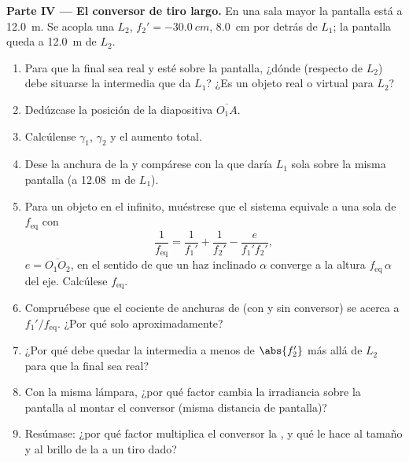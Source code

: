 \begin{problem}
\medskip
\noindent\textbf{Parte IV --- El conversor de tiro largo.}
En una sala mayor la pantalla está a \qty{12.0}{m}. Se acopla una  $L_2$, $f_2' = \qty{-30.0}{cm}$, \qty{8.0}{cm} por detrás de
$L_1$; la pantalla queda a \qty{12.0}{m} de $L_2$.
\begin{enumerate}[resume]
  \item Para que la  final sea real y esté sobre la pantalla, ¿dónde
        (respecto de $L_2$) debe situarse la  intermedia que da
        $L_1$? ¿Es un objeto real o virtual para $L_2$?
  \item Dedúzcase la posición de la diapositiva $\overline{O_1A}$.
  \item Calcúlense $\gamma_1$, $\gamma_2$ y el aumento total.
  \item Dese la anchura de la  y compárese con la que daría $L_1$
        sola sobre la misma pantalla (a \qty{12.08}{m} de $L_1$).
  \item Para un objeto en el infinito, muéstrese que el sistema equivale
        a una sola  de  $f_{\mathrm{eq}}$ con
        \[
        \frac{1}{f_{\mathrm{eq}}} = \frac{1}{f_1'} + \frac{1}{f_2'} - \frac{e}{f_1' f_2'},
        \]
        $e = \overline{O_1O_2}$, en el sentido de que un haz inclinado
        $\alpha$ converge a la altura $f_{\mathrm{eq}}\,\alpha$ del
        eje. Calcúlese $f_{\mathrm{eq}}$.
  \item Compruébese que el cociente de anchuras de  (con y sin
        conversor) se acerca a $f_1'/f_{\mathrm{eq}}$. ¿Por qué solo
        aproximadamente?
  \item ¿Por qué debe quedar la  intermedia a menos de $\abs{f_2'}$
        más allá de $L_2$ para que la  final sea real?
  \item Con la misma lámpara, ¿por qué factor cambia la irradiancia sobre
        la pantalla al montar el conversor (misma distancia de pantalla)?
  \item Resúmase: ¿por qué factor multiplica el conversor la , y qué le hace al tamaño y al brillo de la  a un tiro
        dado?
\end{enumerate}
\end{problem}
